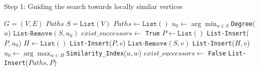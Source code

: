 \documentclass{scrartcl}
\theoremstyle{plain}
\begin{document}
\begin{algorithm}[!ht]
  \caption{Step 1: Guiding the search towards locally similar vertices}
  \label{algo:step1}
  \begin{algorithmic}[1]
  	\REQUIRE $G = (V, E)$
  	\ENSURE $Paths$
	\STATE $S = \texttt{List}(V)$
	\STATE $Paths \leftarrow \texttt{List}()$
    \STATE $u_0 \leftarrow  \arg\min_{u\in S}$\texttt{Degree}($u$)
    \STATE $\texttt{List-Remove}(S, u_0)$
    \STATE $exist\_successors \leftarrow$ \texttt{True}
    \STATE $ P\leftarrow \texttt{List}()$
    \STATE \texttt{List-Insert}($P, u_0$)
    \STATE $H\leftarrow \texttt{List}()$
    \STATE \texttt{List-Insert}($P, v$)
    \STATE $\texttt{List-Remove}(S, v)$
    \ELSE
    \STATE \texttt{List-Insert}($H, v$)
    \ENDIF
    \ENDFOR
    \STATE $u_0 \leftarrow \arg\max_{w\in H}$\texttt{Similarity\_Index}($u,w$)	
    \ELSE
    \STATE $exist\_successors \leftarrow$ \texttt{False}
    \ENDIF
    \ENDWHILE
    \STATE \texttt{List-Insert}($Paths, P$)
    \ENDWHILE
  \end{algorithmic}
\end{algorithm}
\end{document}
